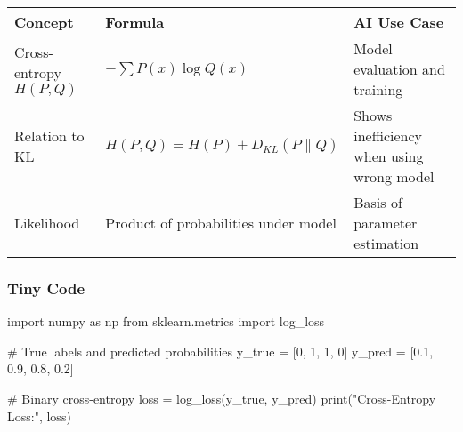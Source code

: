 \documentclass[
  letterpaper,
  DIV=11,
  numbers=noendperiod]{scrreprt}
\newenvironment{Shaded}{\begin{snugshade}}{\end{snugshade}}
\newcommand{\BuiltInTok}[1]{\textcolor[rgb]{0.00,0.23,0.31}{#1}}
\newcommand{\CommentTok}[1]{\textcolor[rgb]{0.37,0.37,0.37}{#1}}
\newcommand{\DecValTok}[1]{\textcolor[rgb]{0.68,0.00,0.00}{#1}}
\newcommand{\FloatTok}[1]{\textcolor[rgb]{0.68,0.00,0.00}{#1}}
\newcommand{\ImportTok}[1]{\textcolor[rgb]{0.00,0.46,0.62}{#1}}
\newcommand{\NormalTok}[1]{\textcolor[rgb]{0.00,0.23,0.31}{#1}}
\newcommand{\OperatorTok}[1]{\textcolor[rgb]{0.37,0.37,0.37}{#1}}
\newcommand{\StringTok}[1]{\textcolor[rgb]{0.13,0.47,0.30}{#1}}
\begin{document}
\begin{longtable}[]{@{}
  >{\raggedright\arraybackslash}p{}
  >{\raggedright\arraybackslash}p{}
  >{\raggedright\arraybackslash}p{}@{}}
\toprule\noalign{}
\begin{minipage}[b]{\linewidth}\raggedright
Concept
\end{minipage} & \begin{minipage}[b]{\linewidth}\raggedright
Formula
\end{minipage} & \begin{minipage}[b]{\linewidth}\raggedright
AI Use Case
\end{minipage} \\
\midrule\noalign{}
\endhead
\bottomrule\noalign{}
\endlastfoot
Cross-entropy \(H(P,Q)\) & \(-\sum P(x)\log Q(x)\) & Model evaluation
and training \\
Relation to KL & \(H(P,Q) = H(P) + D_{KL}(P\parallel Q)\) & Shows
inefficiency when using wrong model \\
Likelihood & Product of probabilities under model & Basis of parameter
estimation \\
\end{longtable}

\subsubsection{Tiny Code}\label{tiny-code-164}

\begin{Shaded}
\begin{Highlighting}[]
\ImportTok{import}\NormalTok{ numpy }\ImportTok{as}\NormalTok{ np}
\ImportTok{from}\NormalTok{ sklearn.metrics }\ImportTok{import}\NormalTok{ log\_loss}

\CommentTok{\# True labels and predicted probabilities}
\NormalTok{y\_true }\OperatorTok{=}\NormalTok{ [}\DecValTok{0}\NormalTok{, }\DecValTok{1}\NormalTok{, }\DecValTok{1}\NormalTok{, }\DecValTok{0}\NormalTok{]}
\NormalTok{y\_pred }\OperatorTok{=}\NormalTok{ [}\FloatTok{0.1}\NormalTok{, }\FloatTok{0.9}\NormalTok{, }\FloatTok{0.8}\NormalTok{, }\FloatTok{0.2}\NormalTok{]}

\CommentTok{\# Binary cross{-}entropy}
\NormalTok{loss }\OperatorTok{=}\NormalTok{ log\_loss(y\_true, y\_pred)}
\BuiltInTok{print}\NormalTok{(}\StringTok{"Cross{-}Entropy Loss:"}\NormalTok{, loss)}
\end{Highlighting}
\end{Shaded}
\end{document}
